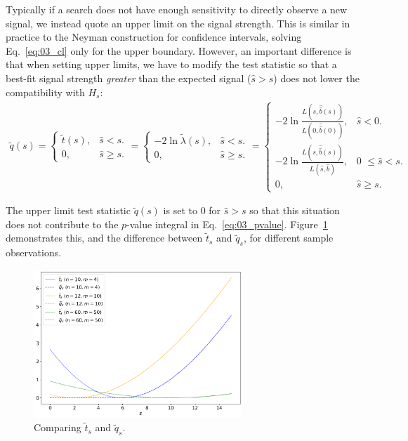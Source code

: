 Typically if a search does not have enough sensitivity to directly observe a new signal, we instead quote an upper limit on the signal strength.
This is similar in practice to the Neyman construction for confidence intervals, solving Eq.~\ref{eq:03_cl} only for the upper boundary. However, an important difference is that when setting upper limits, we have to modify the test statistic so that a best-fit signal strength \textit{greater} than the expected signal ($\hat{s} > s$) does not lower the compatibility with $H_s$:
\begin{gather}
    \tilde{q}(s) = \left\{
        \begin{array}{ll}
          \tilde{t}(s), & \mbox{$\hat{s} < s$}.\\
          0, & \mbox{$\hat{s} \geq s$}.
        \end{array}
      \right.
      = \left\{
        \begin{array}{ll}
          -2\ln\tilde{\lambda}(s), & \mbox{$\hat{s} < s$}.\\
          0, & \mbox{$\hat{s} \geq s$}.
        \end{array}
      \right.
      = \left\{
      \begin{array}{ll}
          -2\ln\frac{L(s, \hat{\hat{b}}(s))}{L(0, \hat{\hat{b}}(0))}, & \mbox{$\hat{s}<0$}.\\
          -2\ln\frac{L(s, \hat{\hat{b}}(s))}{L(\hat{s}, \hat{b})}, & \mbox{0 $\leq \hat{s} < s$}.\\
          0, & \mbox{$\hat{s} \geq s$}.
        \end{array}
      \right.
  \label{eq:03_qs_tilde}
\end{gather}

The upper limit test statistic $\tilde{q}(s)$ is set to $0$ for $\hat{s} > s$ so that this situation does not contribute to the $p$-value integral in Eq.~\ref{eq:03_pvalue}.
Figure~\ref{fig:03_q_tilde_s} demonstrates this, and the difference between $\tilde{t}_s$ and $\tilde{q}_s$, for different sample observations.

\begin{figure}[htb]
\centering
\includegraphics[width=0.7\textwidth]{figures/03-Stats/03-intervals-and-limits/2.png}
\captionsetup{justification=centering}
\caption{Comparing $\tilde{t}_s$ and $\tilde{q}_s$.}
\label{fig:03_q_tilde_s}
\end{figure}

